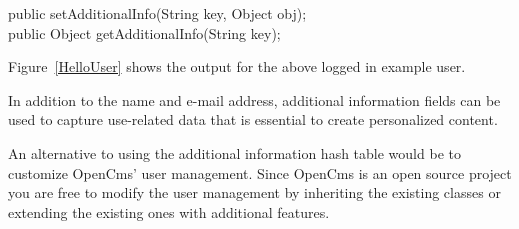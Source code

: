 \begin{java}
public setAdditionalInfo(String key, Object obj);\\
public Object getAdditionalInfo(String key);\\
\end{java}

Figure~\ref{HelloUser} shows the output for the above logged in example user.

In addition to the name and e-mail address, additional information
fields can be used to capture use-related data that is essential to
create personalized content.

An alternative to using the additional information hash table would be
to customize OpenCms' user management. Since OpenCms is an open source
project you are free to modify the user management by inheriting the
existing classes or extending the existing ones with additional features.